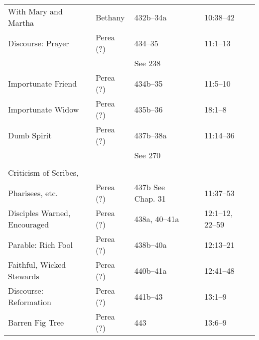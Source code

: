 \begin{longtable}[h]{l@{\hspace{0.5em}}l@{\hspace{0.5em}}l@{\hspace{0.5em}}BBBB}
With Mary and Martha                       & Bethany             & 432b--34a          &                   &                    & 10:38--42             & \\
Discourse: Prayer                          & Perea (?)           & 434--35            &                   &                    & 11:1--13              & \\
                                           &                     & See 238            &                   &                    &                       & \\
\quad Importunate Friend                   & Perea (?)           & 434b--35           &                   &                    & 11:5--10              & \\
\quad Importunate Widow                    & Perea (?)           & 435b--36           &                   &                    & 18:1--8               & \\
\quad Dumb Spirit                          & Perea (?)           & 437b--38a          &                   &                    & 11:14--36             & \\
                                           &                     & See 270            &                   &                    &                       & \\
\\
Criticism of Scribes,                      &                     &                    &                   &                    &                       & \\
\quad Pharisees, etc.                      & Perea (?)           & 437b See Chap. 31  &                   &                    & 11:37--53             & \\
Disciples Warned, Encouraged               & Perea (?)           & 438a, 40--41a      &                   &                    & 12:1--12, 22--59      & \\
Parable: Rich Fool                         & Perea (?)           & 438b--40a          &                   &                    & 12:13--21             & \\
Faithful, Wicked Stewards                  & Perea (?)           & 440b--41a          &                   &                    & 12:41--48             & \\
Discourse: Reformation                     & Perea (?)           & 441b--43           &                   &                    & 13:1--9               & \\
\quad Barren Fig Tree                      & Perea (?)           & 443                &                   &                    & 13:6--9               & \\

\end{longtable}
